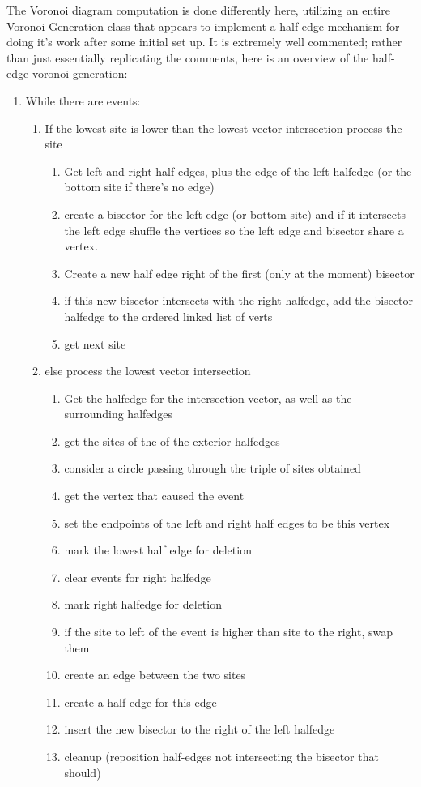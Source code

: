 \documentclass[11pt]{article}
\begin{document}
The Voronoi diagram computation is done differently here, utilizing an entire Voronoi Generation class that appears to implement a half-edge mechanism for doing it's work after some initial set up. It is extremely well commented; rather than just essentially replicating the comments, here is an overview of the half-edge voronoi generation:

\begin{enumerate}
\item While there are events:
\begin{enumerate}
\item If the lowest site is lower than the lowest vector intersection process the site
\begin{enumerate}
\item Get left and right half edges, plus the edge of the left halfedge (or the bottom site if there's no edge)
\item create a bisector for the left edge (or bottom site) and if it intersects the left edge shuffle the vertices so the left edge and bisector share a vertex.
\item Create a new half edge right of the first (only at the moment) bisector
\item if this new bisector intersects with the right halfedge, add the bisector halfedge to the ordered linked list of verts
\item get next site
\end{enumerate}

\item else process the lowest vector intersection
\begin{enumerate}
\item Get the halfedge for the intersection vector, as well as the surrounding halfedges
\item get the sites of the of the exterior halfedges
\item consider a circle passing through the triple of sites obtained
\item get the vertex that caused the event
\item set the endpoints of the left and right half edges to be this vertex
\item mark the lowest half edge for deletion
\item clear events for right halfedge
\item mark right halfedge for deletion
\item if the site to left of the event is higher than site to the right, swap them
\item create an edge between the two sites
\item create a half edge for this edge
\item insert the new bisector to the right of the left halfedge
\item cleanup (reposition half-edges not intersecting the bisector that should)
\end{enumerate}

\end{enumerate}

\end{enumerate}
\end{document}
